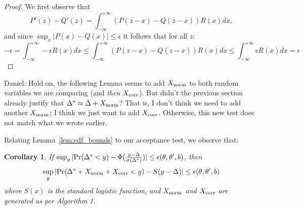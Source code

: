 \documentclass{article}
\newtheorem{corollary}{Corollary}
\begin{document}
\begin{proof}
We first observe that
\begin{equation}\label{eq:pdf_difference}
    P'(z) - Q'(z) = \int_{-\infty}^{+\infty}(P(z-x)-Q(z-x))R(x) dx,
\end{equation}
and since $\sup_x|P(x)-Q(x)|\leq \epsilon$ it follows that for all $z$:
\begin{equation}
-\epsilon = \int_{-\infty}^{+\infty} -\epsilon R(x) dx \leq \int_{-\infty}^{+\infty}(P(z-x)-Q(z-x))R(x) dx \leq \int_{-\infty}^{+\infty}\epsilon R(x) dx = \epsilon
\end{equation}
\end{proof}

{\color{blue} Daniel: Hold on, the following Lemma seems to add $X_{\rm norm}$
to both random variables we are comparing (and \emph{then} $X_{\rm corr}$). But
didn't the previous section already justify that $\Delta^* \approx \Delta +
X_{\rm norm}$? That is, I don't think we need to add another $X_{\rm norm}$; I
think we just want to add $X_{\rm corr}$. Otherwise, this new test does not
match what we wrote earlier.}

Relating Lemma~\ref{lem:cdf_bounds} to our acceptance test, we observe that:

\begin{corollary}\label{cor:bounds_preserved}
If $\sup_y|{\rm Pr}(\Delta^* < y) - \Phi(\frac{y-\Delta}{\sigma(\Delta^*)})|
\leq \epsilon(\theta,\theta',b)$, then
\begin{equation}
    \sup_y|{\rm Pr}(\Delta^*+X_{\rm norm}+X_{\rm corr} < y) - S(y-\Delta)| \leq \epsilon(\theta,\theta',b)
\end{equation}
where $S(x)$ is the standard logistic function, and $X_{\rm norm}$ and $X_{\rm corr}$ are generated as per Algorithm 1. 
\end{corollary}
\end{document}
